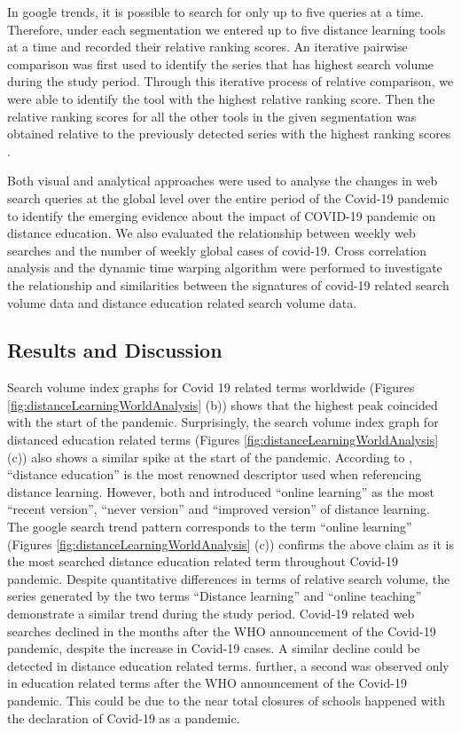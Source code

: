 \documentclass[11pt,a4paper,]{article}
\begin{document}
In google trends, it is possible to search for only up to five queries at a time. Therefore, under each segmentation we entered up to five distance learning tools at a time and recorded their relative ranking scores. An iterative pairwise comparison was first used to identify the series that has highest search volume during the study period. Through this iterative process of relative comparison, we were able to identify the tool with the highest relative ranking score. Then the relative ranking scores for all the other tools in the given segmentation was obtained relative to the previously detected series with the highest ranking scores \autocite{vaughan2014web}.

Both visual and analytical approaches were used to analyse the changes in web search queries at the global level over the entire period of the Covid-19 pandemic to identify the emerging evidence about the impact of COVID-19 pandemic on distance education. We also evaluated the relationship between weekly web searches and the number of weekly global cases of covid-19. Cross correlation analysis and the dynamic time warping algorithm \autocite{giorgino2009computing} were performed to investigate the relationship and similarities between the signatures of covid-19 related search volume data and distance education related search volume data.

\hypertarget{results-and-discussion}{%
\subsection{Results and Discussion}\label{results-and-discussion}}

Search volume index graphs for Covid 19 related terms worldwide (Figures \ref{fig:distanceLearningWorldAnalysis} (b)) shows that the highest peak coincided with the start of the pandemic. Surprisingly, the search volume index graph for distanced education related terms (Figures \ref{fig:distanceLearningWorldAnalysis} (c)) also shows a similar spike at the start of the pandemic. According to \textcite{moore2011learning}, ``distance education'' is the most renowned descriptor used when referencing distance learning. However, both \textcite{benson2002usability} and \textcite{conrad2002deep} introduced ``online learning'' as the most ``recent version'', ``never version'' and ``improved version'' of distance learning. The google search trend pattern corresponds to the term ``online learning'' (Figures \ref{fig:distanceLearningWorldAnalysis} (c)) confirms the above claim as it is the most searched distance education related term throughout Covid-19 pandemic. Despite quantitative differences in terms of relative search volume, the series generated by the two terms ``Distance learning'' and ``online teaching'' demonstrate a similar trend during the study period. Covid-19 related web searches declined in the months after the WHO announcement of the Covid-19 pandemic, despite the increase in Covid-19 cases. A similar decline could be detected in distance education related terms. further, a second was observed only in education related terms after the WHO announcement of the Covid-19 pandemic. This could be due to the near total closures of schools happened with the declaration of Covid-19 as a pandemic.
\end{document}
